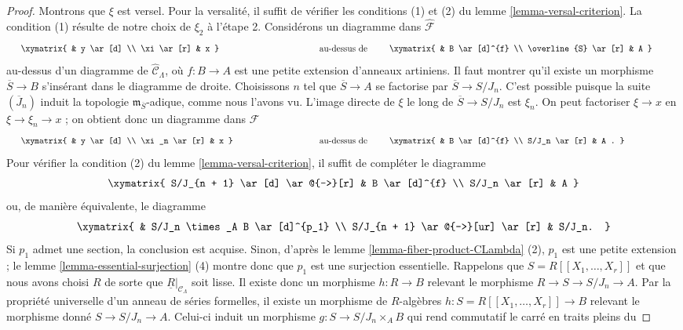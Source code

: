 \begin{proof}
\medskip\noindent
Montrons que $\xi$ est versel. Pour la versalité, il suffit de vérifier les
conditions (1) et (2) du lemme \ref{lemma-versal-criterion}. La condition (1)
résulte de notre choix de $\xi_2$ à l'étape 2. Considérons un diagramme dans
$\widehat{\mathcal{F}}$
$$
\vcenter{
\xymatrix{
            &  y \ar[d] \\
\xi \ar[r]  &  x
}
}
\quad\text{au-dessus de}\quad
\vcenter{
\xymatrix{
         &   B  \ar[d]^{f} \\
\overline{S} \ar[r] &   A
}
}
$$
au-dessus d'un diagramme de $\widehat{\mathcal{C}}_\Lambda$, où
$f: B \to A$ est une petite extension d'anneaux artiniens. Il faut montrer
qu'il existe un morphisme $\overline{S} \to B$ s'insérant dans le
diagramme de droite. Choisissons $n$ tel que $\overline{S} \to A$ se
factorise par $\overline{S} \to S/J_n$. C'est possible puisque la suite
$(\overline{J}_n)$ induit la topologie $\mathfrak m_{\overline{S}}$-adique,
comme nous l'avons vu. L'image directe de $\xi$ le long de
$\overline{S} \to S/J_n$ est $\xi_n$. On peut factoriser $\xi \to x$ en
$\xi \to \xi_n \to x$ ; on obtient donc un diagramme dans $\mathcal{F}$
$$
\vcenter{
\xymatrix{
            &  y \ar[d] \\
\xi_n \ar[r]  &  x
}
}
\quad\text{au-dessus de}\quad
\vcenter{
\xymatrix{
         &   B  \ar[d]^{f} \\
S/J_n \ar[r] &   A .
}
}
$$
Pour vérifier la condition (2) du lemme \ref{lemma-versal-criterion}, il
suffit de compléter le diagramme
$$
\xymatrix{
S/J_{n + 1} \ar[d] \ar@{-->}[r] & B \ar[d]^{f} \\
S/J_n   \ar[r] & A
}
$$
ou, de manière équivalente, le diagramme
$$
\xymatrix{
  &  S/J_n \times_A B \ar[d]^{p_1} \\
S/J_{n + 1} \ar@{-->}[ur] \ar[r] &  S/J_n.
}
$$
Si $p_1$ admet une section, la conclusion est acquise. Sinon, d'après le lemme
\ref{lemma-fiber-product-CLambda} (2), $p_1$ est une petite extension ; le
lemme \ref{lemma-essential-surjection} (4) montre donc que $p_1$ est une
surjection essentielle. Rappelons que $S = R[[X_1, \ldots, X_r]]$ et que
nous avons choisi $R$ de sorte que
$\underline{R}|_{\mathcal{C}_\Lambda}$ soit lisse. Il existe donc un
morphisme $h : R \to B$ relevant le morphisme
$R \to S \to S/J_n \to A$. Par la propriété universelle d'un anneau de
séries formelles, il existe un morphisme de $R$-algèbres
$h : S = R[[X_1, \ldots, X_r]] \to B$ relevant le morphisme donné
$S \to S/J_n \to A$. Celui-ci induit un morphisme
$g: S \to S/J_n \times_A B$ qui rend commutatif le carré en traits pleins du

\end{proof}
